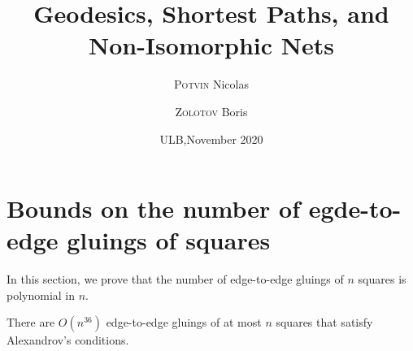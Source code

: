 \documentclass[a4paper,11pt]{article}
\title{Geodesics, Shortest Paths, and Non-Isomorphic Nets}
\author{{\scshape Potvin} Nicolas \and {\scshape Zolotov} Boris}
\date{ULB,\quad November 2020}
\begin{document}
 \maketitle

\section{Bounds on the number of egde-to-edge gluings of squares}

In this section, we prove that the number of edge-to-edge gluings of $n$ squares is polynomial in $n$.

\begin{theorem}
	There are $O \left( n^{36} \right)$ edge-to-edge gluings of at most $n$ squares that satisfy Alexandrov's conditions.
\end{theorem}
\end{document}
